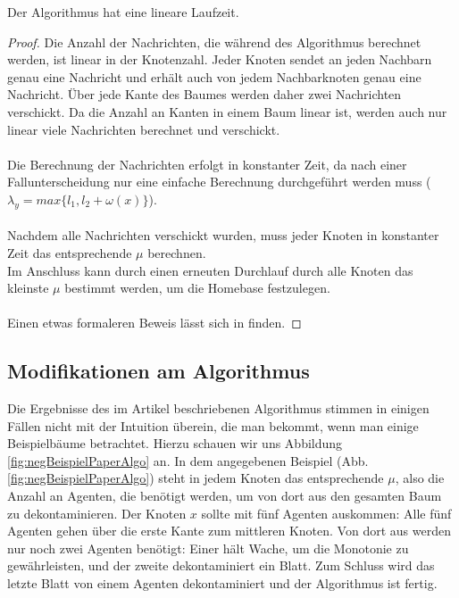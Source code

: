 	\begin{theorem}\label{thm_laufzeit}
		Der Algorithmus hat eine lineare Laufzeit.
	\end{theorem}
	\begin{proof}
		Die Anzahl der Nachrichten, die während des Algorithmus berechnet werden, ist linear in der Knotenzahl. Jeder Knoten sendet an jeden Nachbarn genau eine Nachricht und erhält auch von jedem Nachbarknoten genau eine Nachricht. Über jede Kante des Baumes werden daher zwei Nachrichten verschickt. Da die Anzahl an Kanten in einem Baum linear ist, werden auch nur linear viele Nachrichten berechnet und verschickt.\\\\
		Die Berechnung der Nachrichten erfolgt in konstanter Zeit, da nach einer Fallunterscheidung nur eine einfache Berechnung durchgeführt werden muss ($\lambda_{y} = max\{l_{1},  l_{2} + \omega(x)\}$).\\\\
		Nachdem alle Nachrichten verschickt wurden, muss jeder Knoten in konstanter Zeit das entsprechende $\mu$ berechnen.\\
		Im Anschluss kann durch einen erneuten Durchlauf durch alle Knoten das kleinste $\mu$ bestimmt werden, um die Homebase festzulegen.
		\\
		\\
		Einen etwas formaleren Beweis lässt sich in \cite{cima_paper} finden.
	\end{proof}

\newpage

\subsection{Modifikationen am Algorithmus}\label{modifizierterAlgoChapter}



Die Ergebnisse des im Artikel beschriebenen Algorithmus stimmen in einigen Fällen nicht mit der Intuition überein, die man bekommt, wenn man einige Beispielbäume betrachtet. Hierzu schauen wir uns Abbildung \ref{fig:negBeispielPaperAlgo} an. In dem  angegebenen Beispiel (Abb. \ref{fig:negBeispielPaperAlgo}) steht in jedem Knoten das entsprechende $\mu$, also die Anzahl an Agenten, die benötigt werden, um von dort aus den gesamten Baum zu dekontaminieren. Der Knoten $x$ sollte mit fünf Agenten auskommen: Alle fünf Agenten gehen über die erste Kante zum mittleren Knoten. Von dort aus werden nur noch zwei Agenten benötigt: Einer hält Wache, um die Monotonie zu gewährleisten, und der zweite dekontaminiert ein Blatt. Zum Schluss wird das letzte Blatt von einem Agenten dekontaminiert und der Algorithmus ist fertig.

